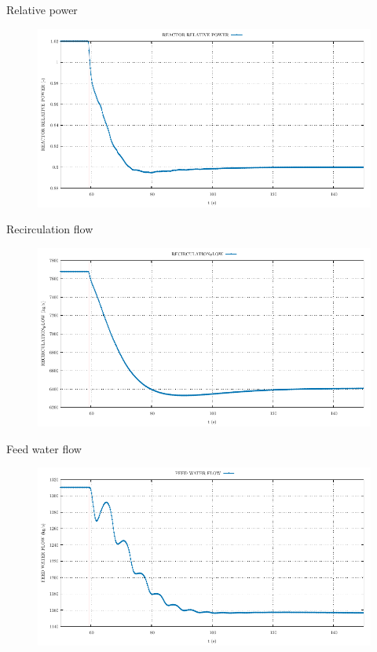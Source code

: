 \begin{frame}{Relative power}
\begin{figure}
	\centering
	\includegraphics[width=\textwidth]{./graphs/REACTOR RELATIVE POWER_comp.pdf}
	
\end{figure}
\end{frame}
\begin{frame}{Recirculation flow}
	\begin{figure}
		\centering
		\includegraphics[width=\textwidth]{./graphs/RECIRCULATION_FLOW_comp.pdf}
		
	\end{figure}

\end{frame}
\begin{frame}{Feed water flow}
	\begin{figure}
		\centering
		\includegraphics[width=\textwidth]{./graphs/FEED WATER FLOW_comp.pdf}
		
	\end{figure}
	
\end{frame}

